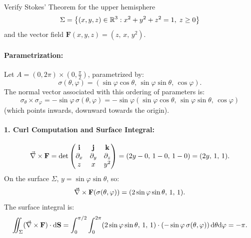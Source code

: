 \begin{exemple}
Verify Stokes' Theorem for the upper hemisphere
\begin{equation*}
    \Sigma = \left\{ (x,y,z) \in \mathbb{R}^3 : x^2 + y^2 + z^2 = 1, \; z \ge 0 \right\}
\end{equation*}
and the vector field $\mathbf{F}(x,y,z) = (z, \, x, \, y^2)$.

\paragraph{Parametrization:}
Let $A = (0, 2\pi) \times \left(0, \tfrac{\pi}{2}\right)$, parametrized by:
\begin{equation*}
    \sigma(\theta, \varphi) = (\sin\varphi \cos\theta, \, \sin\varphi \sin\theta, \, \cos\varphi).
\end{equation*}
The normal vector associated with this ordering of parameters is:
\begin{equation*}
    \sigma_\theta \times \sigma_\varphi = -\sin\varphi \, \sigma(\theta, \varphi) = -\sin\varphi (\sin\varphi\cos\theta, \, \sin\varphi\sin\theta, \, \cos\varphi)
\end{equation*}
(which points inwards, downward towards the origin).

\paragraph{1. Curl Computation and Surface Integral:}
\begin{equation*}
    \vec{\nabla}\times \mathbf{F} = \det \begin{pmatrix} \mathbf{i} & \mathbf{j} & \mathbf{k} \\ \partial_x & \partial_y & \partial_z \\ z & x & y^2 \end{pmatrix} = (2y - 0, \, 1 - 0, \, 1 - 0) = (2y, \, 1, \, 1).
\end{equation*}
On the surface $\Sigma$, $y = \sin\varphi\sin\theta$, so:
\begin{equation*}
    \vec{\nabla}\times \mathbf{F}(\sigma(\theta,\varphi)) = (2\sin\varphi\sin\theta, \, 1, \, 1).
\end{equation*}
The surface integral is:
\begin{equation*}
    \iint_{\Sigma} (\vec{\nabla}\times \mathbf{F}) \cdot \mathrm{d}\mathbf{S} = \int_0^{\pi/2} \int_0^{2\pi} (2\sin\varphi\sin\theta, \, 1, \, 1) \cdot \left(-\sin\varphi \, \sigma(\theta,\varphi)\right) \mathrm{d}\theta \mathrm{d}\varphi = \mathbf{-\pi}.
\end{equation*}


\end{exemple}
